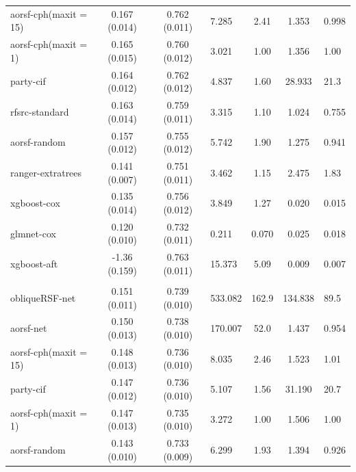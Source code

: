 \documentclass[twoside,11pt]{article}\usepackage[]{graphicx}\usepackage[]{color}
\newenvironment{knitrout}{}{} %
\begin{document}
\begin{knitrout}
\begin{longtable}{lcclccl}
\hspace{1em}aorsf-cph(maxit = 15) & 0.167 (0.014) & 0.762 (0.011) & 7.285 & 2.41 & 1.353 & 0.998\\
\hspace{1em}aorsf-cph(maxit = 1) & 0.165 (0.015) & 0.760 (0.012) & 3.021 & 1.00 & 1.356 & 1.00\\
\hspace{1em}party-cif & 0.164 (0.012) & 0.762 (0.012) & 4.837 & 1.60 & 28.933 & 21.3\\
\hspace{1em}rfsrc-standard & 0.163 (0.014) & 0.759 (0.011) & 3.315 & 1.10 & 1.024 & 0.755\\
\hspace{1em}aorsf-random & 0.157 (0.012) & 0.755 (0.012) & 5.742 & 1.90 & 1.275 & 0.941\\
\hspace{1em}ranger-extratrees & 0.141 (0.007) & 0.751 (0.011) & 3.462 & 1.15 & 2.475 & 1.83\\
\hspace{1em}xgboost-cox & 0.135 (0.014) & 0.756 (0.012) & 3.849 & 1.27 & 0.020 & 0.015\\
\hspace{1em}glmnet-cox & 0.120 (0.010) & 0.732 (0.011) & 0.211 & 0.070 & 0.025 & 0.018\\
\hspace{1em}xgboost-aft & -1.36 (0.159) & 0.763 (0.011) & 15.373 & 5.09 & 0.009 & 0.007\\
\addlinespace[0.3em]
\hline
\multicolumn{7}{l}{\textit{\textbf{Rotterdam tumor bank; recurrence, n = 2982, p = 11}}}\\
\hline
\hspace{1em}obliqueRSF-net & 0.151 (0.011) & 0.739 (0.010) & 533.082 & 162.9 & 134.838 & 89.5\\
\hspace{1em}aorsf-net & 0.150 (0.013) & 0.738 (0.010) & 170.007 & 52.0 & 1.437 & 0.954\\
\hspace{1em}aorsf-cph(maxit = 15) & 0.148 (0.013) & 0.736 (0.010) & 8.035 & 2.46 & 1.523 & 1.01\\
\hspace{1em}party-cif & 0.147 (0.012) & 0.736 (0.010) & 5.107 & 1.56 & 31.190 & 20.7\\
\hspace{1em}aorsf-cph(maxit = 1) & 0.147 (0.013) & 0.735 (0.010) & 3.272 & 1.00 & 1.506 & 1.00\\
\hspace{1em}aorsf-random & 0.143 (0.010) & 0.733 (0.009) & 6.299 & 1.93 & 1.394 & 0.926\\

\end{longtable}
\end{knitrout}
\end{document}
